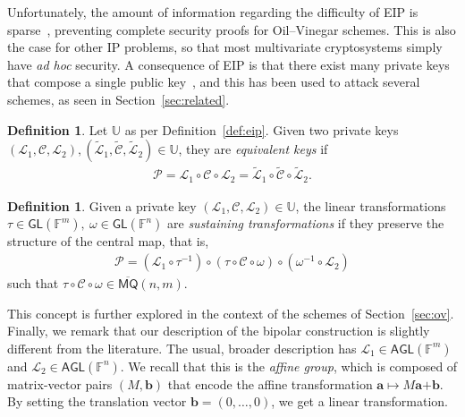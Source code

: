 \documentclass[12pt, a4paper, oneside]{memoir}
\theoremstyle{definition}
\newtheorem{definition}[theorem]{Definition}
\begin{document}
Unfortunately, the amount of information regarding the difficulty of EIP is sparse~\cite[p.~69]{Thomae:201306}, preventing complete security proofs for Oil--Vinegar schemes. This is also the case for other IP problems, so that most multivariate cryptosystems simply have \emph{ad hoc} security. A consequence of EIP is that there exist many private keys that compose a single public key~\cite{Wolf:201104}, and this has been used to attack several schemes, as seen in Section~\ref{sec:related}.

\begin{definition}
  Let $\mathbb{U}$ as per Definition~\ref{def:eip}. Given two private keys $(\mathcal{L}_{1}, \mathcal{C}, \mathcal{L}_{2}), (\widetilde{\mathcal{L}}_{1}, \widetilde{\mathcal{C}}, \widetilde{\mathcal{L}}_{2}) \in \mathbb{U}$, they are \emph{equivalent keys} if
  \begin{align}
    \mathcal{P} = \mathcal{L}_{1} \circ \mathcal{C} \circ \mathcal{L}_{2}
      = \widetilde{\mathcal{L}}_{1} \circ \widetilde{\mathcal{C}} \circ \widetilde{\mathcal{L}}_{2}.
  \end{align}
\end{definition}

\begin{definition}\label{def:sustainer}
  Given a private key $(\mathcal{L}_{1}, \mathcal{C}, \mathcal{L}_{2}) \in \mathbb{U}$, the linear transformations $\tau \in \mathsf{GL}(\mathbb{F}^{m}),\: \omega \in \mathsf{GL}(\mathbb{F}^{n})$ are \emph{sustaining transformations} if they preserve the structure of the central map, that is,
  \begin{align}
    \mathcal{P} = (\mathcal{L}_{1} \circ \tau^{-1}) \circ (\tau \circ \mathcal{C} \circ \omega) \circ (\omega^{-1} \circ \mathcal{L}_{2})
  \end{align}
  such that $\tau \circ \mathcal{C} \circ \omega \in \overline{\mathsf{MQ}}(n, m)$.
\end{definition}

This concept is further explored in the context of the schemes of Section~\ref{sec:ov}. Finally, we remark that our description of the bipolar construction is slightly different from the literature. The usual, broader description has $\mathcal{L}_{1} \in \mathsf{AGL}(\mathbb{F}^{m})$ and $\mathcal{L}_{2} \in \mathsf{AGL}(\mathbb{F}^{n})$. We recall that this is the \emph{affine group}, which is composed of matrix-vector pairs $(M, \mathbf{b})$ that encode the affine transformation $\mathbf{a} \mapsto M\mathbf{a} \bm{+} \mathbf{b}$. By setting the translation vector $\mathbf{b} = (0, \dots, 0)$, we get a linear transformation. 
\end{document}
